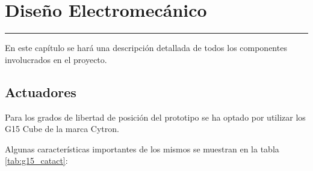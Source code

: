 \chapter{Diseño Electromecánico} \label{chap:Electronica}
\hrule
\vspace{3mm}
En este capítulo se hará una descripción detallada de todos los componentes involucrados en el proyecto.

\section{Actuadores} \label{sec:Electronica:Actuadores}
\label{sec:Electronica:Actuadores:G15}

    Para los grados de libertad de posición del prototipo se ha optado por utilizar los  G15 Cube de la marca Cytron.

    Algunas características importantes de los mismos se muestran en la tabla \ref{tab:g15_catact}:

